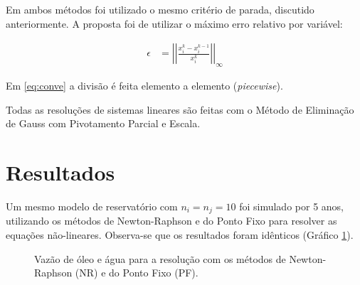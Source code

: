 \documentclass[final,5p]{elsarticle}
\numberwithin{equation}{section}
\begin{document}
        Em ambos métodos foi utilizado o mesmo critério de parada, discutido anteriormente\cite{relatoriojacobi}. A proposta foi de utilizar o máximo erro relativo por variável:

        \begin{align}
            \epsilon &= \left|\left|\frac{x_i^k - x_i^{k-1}}{x_i^k}\right|\right|_\infty \label{eq:conve}
        \end{align}

        Em \ref{eq:conve} a divisão é feita elemento a elemento (\emph{piecewise}).

        Todas as resoluções de sistemas lineares são feitas com o Método de Eliminação de Gauss com Pivotamento Parcial e Escala\cite{relatoriogauss}.

\section{Resultados}

        Um mesmo modelo de reservatório com $n_i=n_j=10$ foi simulado por 5 anos, utilizando os métodos de Newton-Raphson e do Ponto Fixo para resolver as equações não-lineares. Observa-se que os resultados foram idênticos (Gráfico \ref{fig:vazao}).

        \begin{figure}[hbt!]
            \caption{Vazão de óleo e água para a resolução com os métodos de Newton-Raphson (NR) e do Ponto Fixo (PF).}
            \label{fig:vazao}
        \end{figure}
\end{document}
